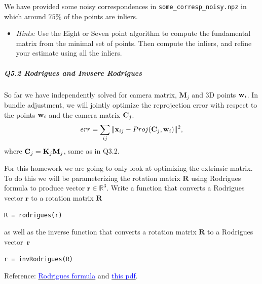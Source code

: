 We have provided some noisy correspondences in \texttt{some\_corresp\_noisy.npz} in which around $75\%$ of the points are inliers. 


\begin{itemize}
    \item \emph{Hints:} Use the Eight or Seven point algorithm to compute the fundamental matrix from the minimal set of points. Then compute the inliers, and refine your estimate using all the inliers.
\end{itemize}

\begin{your_solution}[title=Q5.1,height=5.5cm,width=\linewidth]
\end{your_solution}

\subparagraph*{Q5.2 Rodrigues and Invsere Rodrigues}
So far we have independently solved for camera matrix, $\mathbf{M}_j$ and 3D points ${\bf w}_i$. In bundle adjustment, we will jointly optimize the reprojection error with respect to the points ${\bf w}_i$ and the camera matrix ${\bf C}_j$.
$$
err = \sum_{ij} \|{\bf x}_{ij} - Proj(\mathbf{C}_j, {\bf w}_i)\|^2,
$$
where ${\bf C}_j = \mathbf{K}_j \mathbf{M}_j$, same as in Q3.2.

For this homework we are going to only look at optimizing the extrinsic matrix. To do this we will be parameterizing the rotation matrix $\mathbf{R}$ using Rodrigues formula to produce vector $\mathbf{r} \in \mathbb{R}^3$. Write a function that converts a Rodrigues vector $\mathbf{r}$ to a rotation matrix $\mathbf{R}$
\begin{center}
\texttt{R = rodrigues(r)}
\end{center}
as well as the inverse function that converts a rotation matrix $\mathbf{R}$ to a Rodrigues vector~$\mathbf{r}$
\begin{center}
\texttt{r = invRodrigues(R)}
\end{center}
Reference: \href{https://en.wikipedia.org/wiki/Rodrigues\%27\_formula}{\textcolor{blue}{Rodrigues formula}} and \href{https://www2.cs.duke.edu/courses/fall13/compsci527/notes/rodrigues.pdf}{\textcolor{blue}{this pdf}}.


